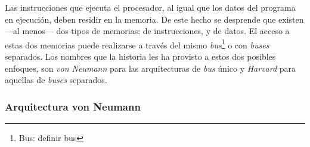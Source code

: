 Las instrucciones que ejecuta el procesador, al igual que los datos del programa
en ejecución, deben residir en la memoria. De este hecho se desprende que
existen ---al menos--- dos tipos de memorias: de instrucciones, y de datos. El
acceso a estas dos memorias puede realizarse a través del mismo
\emph{bus}\footnote{Bus: definir bus} o con \emph{buses} separados. Los nombres
que la historia les ha provisto a estos dos posibles enfoques, son
\emph{von Neumann} para las arquitecturas de \emph{bus} único y \emph{Harvard}
para aquellas de \emph{buses} separados.

\subsubsection{Arquitectura von Neumann}
\label{subsubsec:theory-modern-memory_access-von_neumann}

